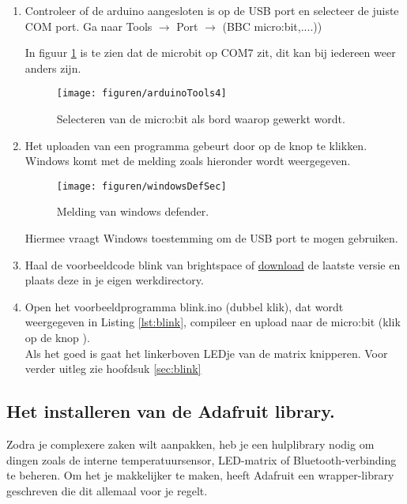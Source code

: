\begin{enumerate}
\item Controleer of de arduino aangesloten is op de USB port en selecteer de juiste COM port. Ga naar Tools $\rightarrow$ Port $\rightarrow$ (BBC micro:bit,....))

In figuur \ref{fig:ardTool4} is te zien dat de microbit op COM7 zit, dit kan bij iedereen weer anders zijn.
\begin{figure}[H]
	\captionsetup{justification=centering}
	\texttt{[image: figuren/arduinoTools4]}
	\centering
	\caption{Selecteren van de micro:bit als bord waarop gewerkt wordt.}
	\label{fig:ardTool4}
\end{figure}

\item Het uploaden van een programma gebeurt door op de knop  te klikken. Windows komt met de melding zoals hieronder wordt weergegeven. 
   	\begin{figure}[h!]
   	\captionsetup{justification=centering}
   	\texttt{[image: figuren/windowsDefSec]}
   	\centering
   	\caption{Melding van windows defender.}
   	\label{fig:windowsDef}
   \end{figure}
Hiermee vraagt Windows toestemming om de USB port te mogen gebruiken.
\item Haal de voorbeeldcode blink van brightspace of \href{https://github.com/JohnVi-hhs/embsysP/tree/main/voorbeelden/blink.ino}{download} de laatste versie en plaats deze in je eigen werkdirectory.
\item \label{en:blink} Open het voorbeeldprogramma blink.ino (dubbel klik), dat wordt weergegeven in Listing \ref{lst:blink}, compileer en upload naar de micro:bit (klik op de knop ). \\
Als het goed is gaat het linkerboven LEDje van de matrix knipperen. Voor verder uitleg zie hoofdsuk \ref{sec:blink}


\end{enumerate}

\subsection{Het installeren van de Adafruit library.}\label{sec:insAdafruit}

Zodra je complexere zaken wilt aanpakken, heb je een hulplibrary nodig om dingen zoals de interne temperatuursensor, LED-matrix of Bluetooth-verbinding te beheren.
Om het je makkelijker te maken, heeft Adafruit een wrapper-library geschreven die dit allemaal voor je regelt.

